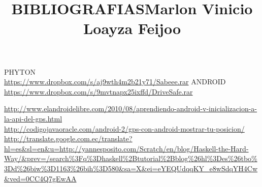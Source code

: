 \documentclass[12pt]{extbook}
\begin{document}
\large{PHYTON}\\
\href{https://www.dropbox.com/s/aj9wth4m2b21y71/Sabeee.rar}{https://www.dropbox.com/s/aj9wth4m2b21y71/Sabeee.rar}
\large{ANDROID}\\
\href{https://www.dropbox.com/s/9mvtnapx25ixffd/DriveSafe.rar}{https://www.dropbox.com/s/9mvtnapx25ixffd/DriveSafe.rar}

\newpage
\begin{center}
\title{BIBLIOGRAFIAS}\maketitle
\end{center}
\href{http://www.elandroidelibre.com/2010/08/aprendiendo-android-v-inicializacion-a-la-api-del-gps.html}{http://www.elandroidelibre.com/2010/08/aprendiendo-android-v-inicializacion-a-la-api-del-gps.html}\\
\href{http://codigojavaoracle.com/android-2/gps-con-android-mostrar-tu-posicion/}{http://codigojavaoracle.com/android-2/gps-con-android-mostrar-tu-posicion/}\\
\href{http://translate.google.com.ec/translate?hl=es&sl=en&u=http://yannesposito.com/Scratch/en/blog/Haskell-the-Hard-Way/&prev=/search\%3Fq\%3Dhaskell\%2Btutorial\%2Bblog\%26hl\%3Des\%26tbo\%3Dd\%26biw\%3D1163\%26bih\%3D580&sa=X&ei=eYEQUdqqKY_e8wSdqYH4Cw&ved=0CC4Q7gEwAA}{http://translate.google.com.ec/translate?hl=es\&{}sl=en\&{}u=http://yannesposito.com/Scratch/en/blog/Haskell-the-Hard-Way/\&{}prev=/search\%{}3Fq\%{}3Dhaskell\%{}2Btutorial\%{}2Bblog\%{}26hl\%{}3Des\%{}26tbo\%{}3Dd\%{}26biw\%{}3D1163\%{}26bih\%{}3D580\&{}sa=X\&{}ei=eYEQUdqqKY\_{}e8wSdqYH4Cw\&{}ved=0CC4Q7gEwAA}
\title{Marlon Vinicio Loayza Feijoo}
\end{document}
